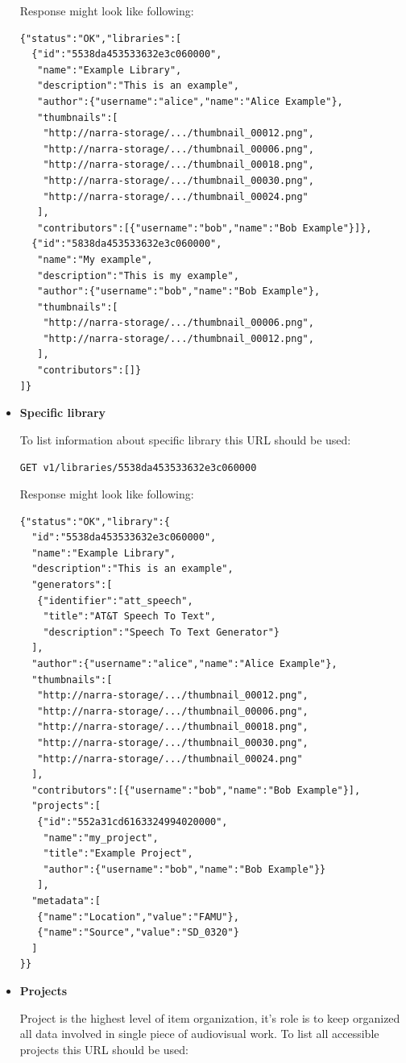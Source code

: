 \documentclass[thesis=B,english]{FITthesis}[2012/10/20]
\begin{document}
\begin{itemize}
Response might look like following:
\begin{verbatim}
{"status":"OK","libraries":[
  {"id":"5538da453533632e3c060000",
   "name":"Example Library",
   "description":"This is an example",
   "author":{"username":"alice","name":"Alice Example"},
   "thumbnails":[
    "http://narra-storage/.../thumbnail_00012.png",
    "http://narra-storage/.../thumbnail_00006.png",
    "http://narra-storage/.../thumbnail_00018.png",
    "http://narra-storage/.../thumbnail_00030.png",
    "http://narra-storage/.../thumbnail_00024.png"
   ],
   "contributors":[{"username":"bob","name":"Bob Example"}]},
  {"id":"5838da453533632e3c060000",
   "name":"My example",
   "description":"This is my example",
   "author":{"username":"bob","name":"Bob Example"},
   "thumbnails":[
    "http://narra-storage/.../thumbnail_00006.png",
    "http://narra-storage/.../thumbnail_00012.png",
   ],
   "contributors":[]}
]}
\end{verbatim}

		\item \textbf{Specific library}

To list information about specific library this URL should be used:

\texttt{GET v1/libraries/5538da453533632e3c060000}

Response might look like following:
\begin{verbatim}
{"status":"OK","library":{
  "id":"5538da453533632e3c060000",
  "name":"Example Library",
  "description":"This is an example",
  "generators":[
   {"identifier":"att_speech",
    "title":"AT&T Speech To Text",
    "description":"Speech To Text Generator"}
  ],
  "author":{"username":"alice","name":"Alice Example"},
  "thumbnails":[
   "http://narra-storage/.../thumbnail_00012.png",
   "http://narra-storage/.../thumbnail_00006.png",
   "http://narra-storage/.../thumbnail_00018.png",
   "http://narra-storage/.../thumbnail_00030.png",
   "http://narra-storage/.../thumbnail_00024.png"
  ],
  "contributors":[{"username":"bob","name":"Bob Example"}],
  "projects":[
   {"id":"552a31cd6163324994020000",
    "name":"my_project",
    "title":"Example Project",
    "author":{"username":"bob","name":"Bob Example"}}
   ],
  "metadata":[
   {"name":"Location","value":"FAMU"},
   {"name":"Source","value":"SD_0320"}
  ]
}}
\end{verbatim}

		\item \textbf{Projects}

Project is the highest level of item organization, it's role is to keep organized all data involved in single piece of audiovisual work. To list all accessible projects this URL should be used:


\end{itemize}
\end{document}

